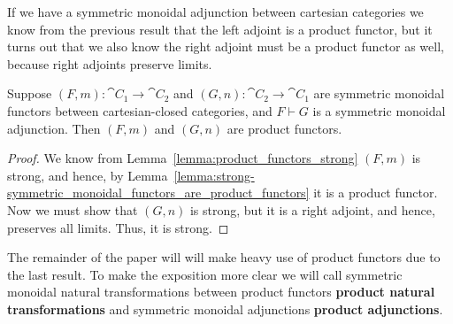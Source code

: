 If we have a symmetric monoidal adjunction between cartesian
categories we know from the previous result that the left adjoint is a
product functor, but it turns out that we also know the right adjoint
must be a product functor as well, because right adjoints preserve
limits.

\begin{lemma}
  \label{lemma:adjoint-CCC-prod-func}
  Suppose $(F,m) : \cat{C}_1 \to \cat{C}_2$ and $(G,n) : \cat{C}_2 \to
  \cat{C}_1$ are symmetric monoidal functors between cartesian-closed
  categories, and $F \vdash G$ is a symmetric monoidal adjunction.
  Then $(F,m)$ and $(G,n)$ are product functors.
\end{lemma}
\begin{proof}
  We know from Lemma~\ref{lemma:product_functors_strong} $(F,m)$ is
  strong, and hence, by
  Lemma~\ref{lemma:strong-symmetric_monoidal_functors_are_product_functors}
  it is a product functor.  Now we must show that $(G,n)$ is strong,
  but it is a right adjoint, and hence, preserves all limits.  Thus,
  it is strong.
\end{proof}
\noindent
The remainder of the paper will will make heavy use of product
functors due to the last result.  To make the exposition more clear we
will call symmetric monoidal natural transformations between product
functors \textbf{product natural transformations} and symmetric
monoidal adjunctions \textbf{product adjunctions}.

